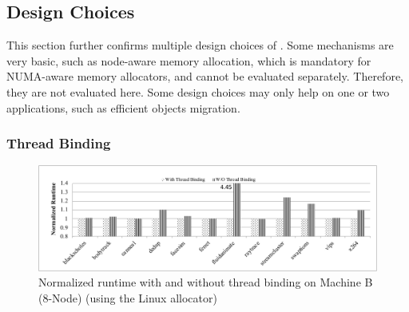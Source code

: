  

\subsection{Design Choices}
\label{sec:design}

This section further confirms multiple design choices of \NM{}. Some mechanisms are very basic, such as node-aware memory allocation, which is mandatory for NUMA-aware memory allocators, and cannot be evaluated separately. Therefore, they are not evaluated here. Some design choices may only help on one or two applications, such as efficient objects migration. 
\subsubsection{Thread Binding}
\label{sec: threadbinding}

\begin{figure}[!h]
    \centering
    \includegraphics[width=\textwidth]{figure/WO-pthread-binding.pdf}
    \caption{Normalized runtime with and without thread binding on Machine B (8-Node) (using the Linux allocator)}
    \label{binding-pthread-scalibity}
\end{figure}

